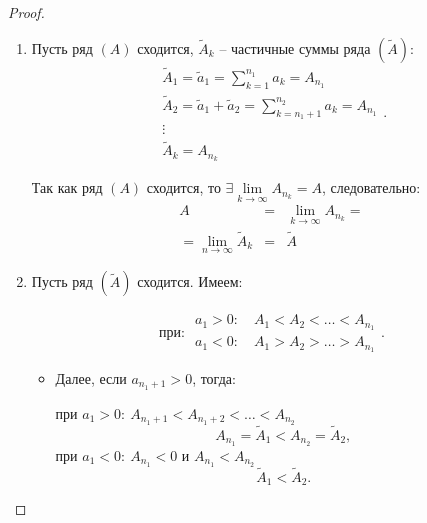 \begin{proof}\leavevmode
    \begin{enumerate}
        \item Пусть ряд $(A)$ сходится, $\widetilde{A}_k$ -- частичные суммы ряда $(\widetilde{A})$:
              \[
                  \begin{array}{l}
                      \widetilde{A}_1 = \widetilde{a}_1 = \sum_{k=1}^{n_1}a_k = A_{n_1}                         \\
                      \widetilde{A}_2 = \widetilde{a}_1 + \widetilde{a}_2 = \sum_{k=n_1 + 1}^{n_2}a_k = A_{n_1} \\
                      \vdots                                                                                    \\
                      \widetilde{A}_k = A_{n_k}
                  \end{array}.
              \]

              Так как ряд $(A)$ сходится, то $ \exists \underset{k\rightarrow\infty}{\lim}A_{n_k} = A $, следовательно:
              \begin{eqnarray*}
                  A &=& \underset{k\rightarrow\infty}{\lim}A_{n_k} = \\
                  = \underset{n\rightarrow\infty}{\lim}\widetilde{A}_k &=& \widetilde{A}
              \end{eqnarray*}

              \newpage

        \item Пусть ряд $(\widetilde{A})$ сходится. Имеем:

              \[
                  \text{при: }\begin{array}{l}
                      a_1 > 0: \quad A_1 < A_2 < \ldots < A_{n_1} \\
                      a_1 < 0: \quad A_1 > A_2 > \ldots > A_{n_1}
                  \end{array}.
              \]

              \begin{itemize}
                  \item Далее, если $a_{n_1 + 1} > 0$, тогда:

                        при $ a_1 > 0: \ A_{n_1 + 1} < A_{n_1 + 2} < \ldots < A_{n_2}$
                        \[
                            A_{n_1} = \widetilde{A}_1 < A_{n_2} = \widetilde{A}_2,
                        \]
                        при $a_1 < 0: \ A_{n_1} < 0$ и $A_{n_1} < A_{n_2} $
                        \[
                            \widetilde{A}_1 < \widetilde{A}_2.
                        \]


\end{itemize}
\end{enumerate}
\end{proof}
